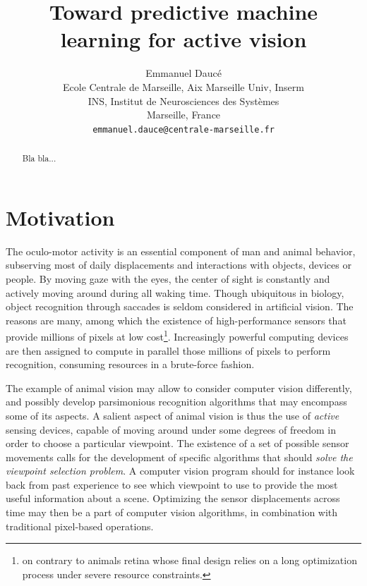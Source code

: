 \documentclass{article} %
\title{Toward predictive machine learning for active vision}
\author{Emmanuel Daucé \\
Ecole Centrale de Marseille, Aix Marseille Univ, Inserm \\
INS, Institut de Neurosciences des Systèmes\\ 
Marseille, France\\
\texttt{emmanuel.dauce@centrale-marseille.fr} \\
}
\begin{document}
\maketitle

\begin{abstract}
Bla bla...

\end{abstract}

\section{Motivation}

	The oculo-motor activity is an essential component of man and animal behavior, subserving most of daily displacements and interactions with objects, devices or people. By moving gaze with the eyes, the center of sight is constantly and actively moving around during all waking time.  %
	Though ubiquitous in biology, object recognition through saccades is seldom considered in artificial vision. The reasons are many, among which the existence of high-performance sensors that provide millions of pixels at low cost\footnote{on contrary to animals retina whose final design relies on a long optimization process under severe resource constraints.}. Increasingly powerful computing devices are then assigned to compute in parallel those millions of pixels to perform recognition, consuming resources in a brute-force fashion. 
	
	The example of animal vision may allow to consider computer vision differently, and possibly develop parsimonious recognition algorithms that may encompass some of its aspects. A salient aspect of animal vision is thus the use of \emph{active} sensing devices, capable of moving around under some degrees of freedom in order to choose a particular viewpoint. The existence of a set of possible sensor movements calls for the development of specific algorithms that should \emph{solve the viewpoint selection problem}. A computer vision program should for instance look back from past experience to see which viewpoint to use to provide the most useful information about a scene. Optimizing the sensor displacements across time may then be a part of computer vision algorithms, in combination with traditional pixel-based operations. 
	
\end{document}
